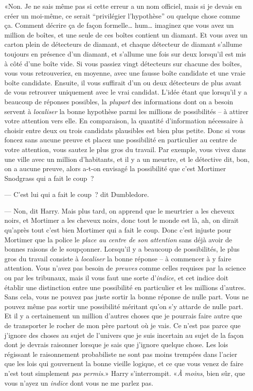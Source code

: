 «Non. Je ne sais même pas si cette erreur a un nom officiel, mais si je devais en créer un moi-même, ce serait “privilégier l'hypothèse” ou quelque chose comme ça. Comment décrire ça de façon formelle… hum… imaginez que vous avez un million de boîtes, et une seule de ces boîtes contient un diamant. Et vous avez un carton plein de détecteurs de diamant, et chaque détecteur de diamant s'allume toujours en présence d'un diamant, et s'allume une fois sur deux lorsqu'il est mis à côté d'une boîte vide. Si vous passiez vingt détecteurs sur chacune des boîtes, vous vous retrouveriez, en moyenne, avec une fausse boîte candidate et une vraie boîte candidate. Ensuite, il vous suffirait d'un ou deux détecteurs de plus avant de vous retrouver uniquement avec le vrai candidat. L'idée étant que lorsqu'il y a beaucoup de réponses possibles, la \emph{plupart} des informations dont on a besoin servent à \emph{localiser} la bonne hypothèse parmi les millions de possibilités -- à attirer votre attention vers elle. En comparaison, la quantité d'information nécessaire à choisir entre deux ou trois candidats plausibles est bien plus petite. Donc si vous foncez sans aucune preuve et placez une possibilité en particulier au centre de votre attention, vous sautez le plus gros du travail. Par exemple, vous vivez dans une ville avec un million d'habitants, et il y a un meurtre, et le détective dit, bon, on a aucune preuve, alors a-t-on envisagé la possibilité que c'est Mortimer Snodgrass qui a fait le coup~?

--- C'est lui qui a fait le coup~? dit Dumbledore.

--- Non, dit Harry. Mais plus tard, on apprend que le meurtrier a les cheveux noirs, et Mortimer a les cheveux noirs, donc tout le monde est là, ah, on dirait qu'après tout c'est bien Mortimer qui a fait le coup. Donc c'est injuste pour Mortimer que la police le \emph{place au centre de son attention} sans déjà avoir de bonnes raisons de le soupçonner. Lorsqu'il y a beaucoup de possibilités, le plus gros du travail consiste à \emph{localiser} la bonne réponse -- à commencer à y faire attention. Vous n'avez pas besoin de \emph{preuves} comme celles requises par la science ou par les tribunaux, mais il vous faut une sorte d'\emph{indice}, et cet indice doit établir une distinction entre une possibilité en particulier et les millions d'autres. Sans cela, vous ne pouvez pas juste sortir la bonne réponse de nulle part. Vous ne pouvez même pas sortir une possibilité méritant qu'on s'y attarde de nulle part. Et il y a certainement un million d'autres choses que je pourrais faire autre que de transporter le rocher de mon père partout où je vais. Ce n'est pas parce que j'ignore des choses au sujet de l'univers que je suis incertain au sujet de la façon dont je devrais raisonner lorsque je sais que j'ignore quelque chose. Les lois régissant le raisonnement probabiliste ne sont pas moins trempées dans l'acier que les lois qui gouvernent la bonne vieille logique, et ce que vous venez de faire n'est tout simplement \emph{pas permis}.» Harry s'interrompit. «\emph{À moins}, bien sûr, que vous n'ayez un \emph{indice} dont vous ne me parlez pas.

